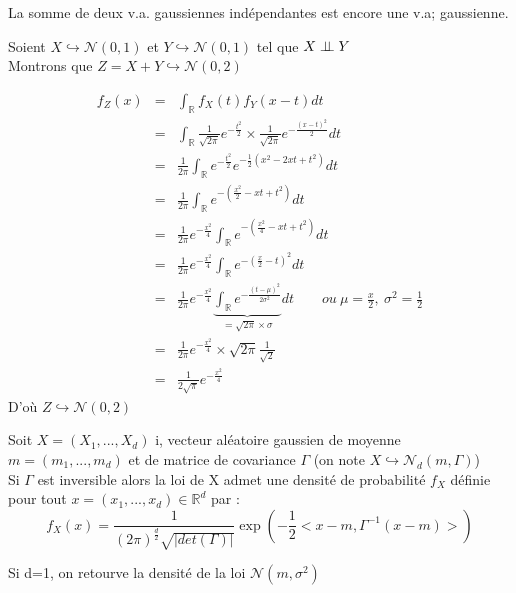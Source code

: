 \begin{coro}
La somme de deux v.a. gaussiennes indépendantes est encore une v.a; gaussienne.
\end{coro}

\begin{dem}
Soient $X\hookrightarrow \mathcal{N}(0,1)$ et $Y\hookrightarrow \mathcal{N}(0,1)$ tel que $X\perp \! \! \! \perp Y$ \\
Montrons que $Z=X+Y \hookrightarrow \mathcal{N}(0,2)$

\begin{eqnarray*}
f_Z(x) &=& \int_{\mathbb{R}} f_X(t) f_Y(x-t) dt \\
&=& \int_{\mathbb{R}} \frac{1}{\sqrt{2\pi}} e^{-\frac{t^2}{2}} \times \frac{1}{\sqrt{2\pi}} e^{-\frac{(x-t)^2}{2}} dt \\
&=& \frac{1}{2\pi} \int_{\mathbb{R}} e^{-\frac{t^2}{2}} e^{-\frac{1}{2}(x^2-2xt+t^2)} dt \\
&=& \frac{1}{2\pi} \int_{\mathbb{R}} e^{-(\frac{x^2}{2} -xt+t^2)} dt \\
&=& \frac{1}{2\pi} e^{-\frac{x^2}{4}} \int_{\mathbb{R}} e^{-(\frac{x^2}{4} -xt+t^2)}dt \\
&=& \frac{1}{2\pi} e^{-\frac{x^2}{4}} \int_{\mathbb{R}} e^{-(\frac{x}{2} -t)^2}dt \\
&=& \frac{1}{2\pi} e^{-\frac{x^2}{4}} \underbrace{\int_{\mathbb{R}} e^{-\frac{(t-\mu)^2}{2\sigma^2}}}_{=\sqrt{2\pi}\times \sigma}dt \qquad ou\ \mu=\frac{x}{2},\ \sigma^2=\frac{1}{2} \\
&=& \frac{1}{2\pi} e^{-\frac{x^2}{4}}\times \sqrt{2\pi}\frac{1}{\sqrt{2}} \\
&=& \frac{1}{2\sqrt{\pi}} e^{-\frac{x^2}{4}}
\end{eqnarray*}
D'où $Z\hookrightarrow \mathcal{N}(0,2)$
\end{dem}

\begin{theo}[admis]
Soit $X=(X_1,...,X_d)$ i, vecteur aléatoire gaussien de moyenne $m=(m_1,...,m_d)$ et de matrice de covariance $\Gamma$ (on note $X\hookrightarrow \mathcal{N}_d(m,\Gamma)$) \\
Si $\Gamma$ est inversible alors la loi de X admet une densité de probabilité $f_X$ définie pour tout $x=(x_1,...,x_d) \in \mathbb{R}^d$ par : 
\[f_X(x)=\frac{1}{(2\pi)^{\frac{d}{2}} \sqrt{|det(\Gamma)|}} \exp\left(-\frac{1}{2} <x-m,\Gamma^{-1} (x-m)> \right)\]
\end{theo}

\begin{rmq}
Si d=1, on retourve la densité de la loi $\mathcal{N}(m,\sigma^2)$ 
\end{rmq}

